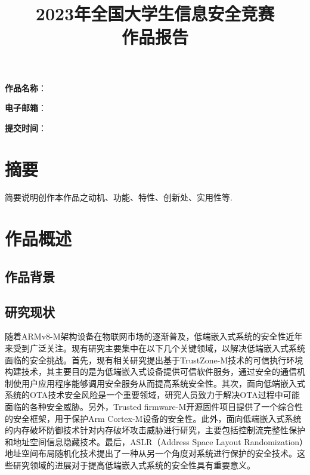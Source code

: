 \documentclass[12pt,a4paper]{ctexart}
\date{}
\title{\Huge\textbf{2023年全国大学生信息安全竞赛\\作品报告}}
\begin{document}
\pagestyle{emptyStyle}
\maketitle
\vspace{6cm}
{
    \Large\textbf{作品名称}：\textbf{\underline{}}

    \textbf{\underline{}}

    \textbf{电子邮箱}：\underline{}

    \textbf{提交时间}：\underline{\makebox[10cm]{\textbf{\today}}}
}
\clearpage

\clearpage
\tableofcontents
\clearpage
\pagestyle{abstractStyle}
\setcounter{page}{1}
\section*{摘要}
简要说明创作本作品之动机、功能、特性、创新处、实用性等.
\clearpage
\pagestyle{articleStyle}
\section{作品概述}
\subsection{作品背景}

\subsection{研究现状}
\par 随着ARMv8-M架构设备在物联网市场的逐渐普及，低端嵌入式系统的安全性近年来受到广泛关注。现有研究主要集中在以下几个关键领域，以解决低端嵌入式系统面临的安全挑战。首先，现有相关研究提出基于TrustZone-M技术的可信执行环境构建技术，其主要目的是为低端嵌入式设备提供可信软件服务，通过安全的通信机制使用户应用程序能够调用安全服务从而提高系统安全性。其次，面向低端嵌入式系统的OTA技术安全风险是一个重要领域，研究人员致力于解决OTA过程中可能面临的各种安全威胁。另外，Trusted firmware-M开源固件项目提供了一个综合性的安全框架，用于保护Arm Cortex-M设备的安全性。此外，面向低端嵌入式系统的内存破坏防御技术针对内存破坏攻击威胁进行研究，主要包括控制流完整性保护和地址空间信息隐藏技术。最后，ASLR（Address Space Layout Randomization）地址空间布局随机化技术提出了一种从另一个角度对系统进行保护的安全技术。这些研究领域的进展对于提高低端嵌入式系统的安全性具有重要意义。
\end{document}

